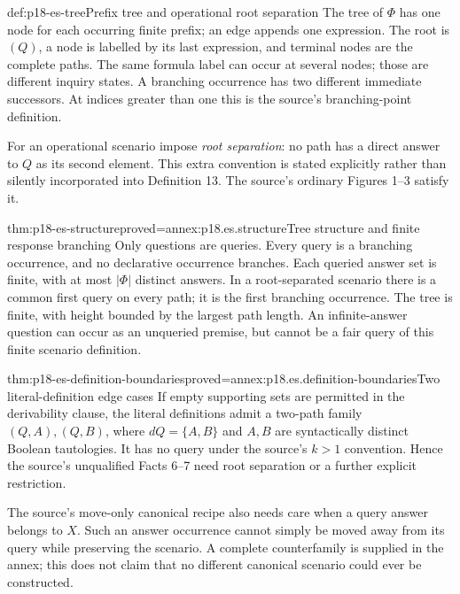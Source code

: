 \begin{hbdefinition}{def:p18-es-tree}{Prefix tree and operational root separation}
The tree of \(\Phi\) has one node for each occurring finite prefix; an
edge appends one expression. The root is \((Q)\), a node is labelled by its
last expression, and terminal nodes are the complete paths. The same formula
label can occur at several nodes; those are different inquiry states.
A branching occurrence has two different immediate successors. At indices
greater than one this is the source's branching-point definition.

For an operational scenario impose \emph{root separation}: no path has
a direct answer to \(Q\) as its second element. This extra convention is
stated explicitly rather than silently incorporated into Definition 13.
The source's ordinary Figures 1--3 satisfy it.
\end{hbdefinition}

\begin{hbtheorem}{thm:p18-es-structure}{proved=annex:p18.es.structure}{Tree structure and finite response branching}
Only questions are queries. Every query is a branching occurrence, and no
declarative occurrence branches. Each queried answer set is finite, with
at most \(|\Phi|\) distinct answers. In a root-separated scenario there is
a common first query on every path; it is the first branching occurrence.
The tree is finite, with height bounded by the largest path length.
An infinite-answer question can occur as an unqueried premise, but cannot
be a fair query of this finite scenario definition.
\end{hbtheorem}

\begin{hbtheorem}{thm:p18-es-definition-boundaries}{proved=annex:p18.es.definition-boundaries}{Two literal-definition edge cases}
If empty supporting sets are permitted in the derivability clause, the literal
definitions admit a two-path family \((Q,A),(Q,B)\), where
\(dQ=\{A,B\}\) and \(A,B\) are syntactically distinct Boolean tautologies.
It has no query under the source's \(k>1\) convention. Hence the source's
unqualified Facts 6--7 need root separation or a further explicit restriction.

The source's move-only canonical recipe also needs care when a query answer
belongs to \(X\). Such an answer occurrence cannot simply be moved away
from its query while preserving the scenario. A complete counterfamily is
supplied in the annex; this does not claim that no different canonical
scenario could ever be constructed.
\end{hbtheorem}

